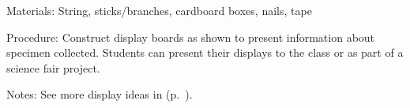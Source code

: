 \begin{multicols}{2}
\begin{description*}
\item[Materials:]{String, sticks/branches, cardboard boxes, nails, tape}
\item[Procedure:]{Construct display boards as shown to present information about specimen collected. Students can present their displays to the class or as part of a science fair project.}
\item[Notes:]{See more display ideas in  (p.~\pageref{cha:displays}).}
\end{description*}



\end{multicols}

\pagebreak